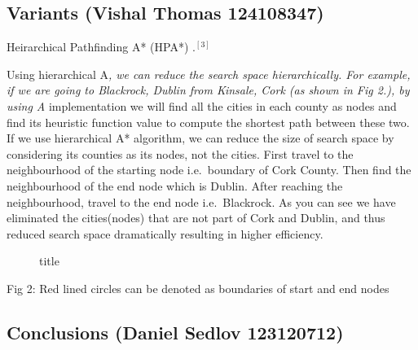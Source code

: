 \documentclass[11pt]{article}
\begin{document}
    \subsection{Variants (Vishal Thomas
124108347)}\label{variants-vishal-thomas-124108347}

Heirarchical Pathfinding A* (HPA*) .\(^{[3]}\)

Using hierarchical A\emph{, we can reduce the search space
hierarchically. For example, if we are going to Blackrock, Dublin from
Kinsale, Cork (as shown in Fig 2.), by using A} implementation we will
find all the cities in each county as nodes and find its heuristic
function value to compute the shortest path between these two. If we use
hierarchical A* algorithm, we can reduce the size of search space by
considering its counties as its nodes, not the cities. First travel to
the neighbourhood of the starting node i.e.~boundary of Cork County.
Then find the neighbourhood of the end node which is Dublin. After
reaching the neighbourhood, travel to the end node i.e.~Blackrock. As
you can see we have eliminated the cities(nodes) that are not part of
Cork and Dublin, and thus reduced search space dramatically resulting in
higher efficiency.

\begin{figure}
\centering
{}
\caption{title}
\end{figure}

Fig 2: Red lined circles can be denoted as boundaries of start and end
nodes

    \subsection{Conclusions (Daniel Sedlov
123120712)}\label{conclusions-daniel-sedlov-123120712}
\end{document}
